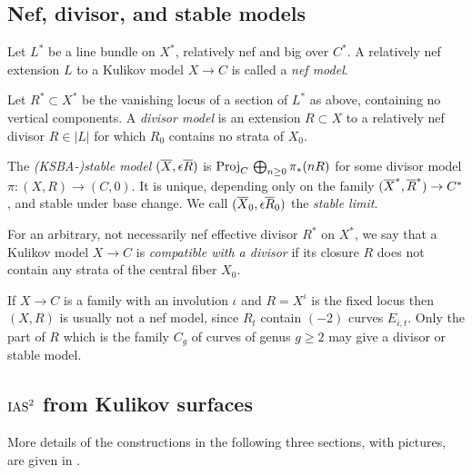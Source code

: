 \documentclass{amsart}
\begin{document}
\subsection{Nef, divisor, and stable models}
\label{sec:nef-divisor-models}

\begin{definition}
  Let $L^*$ be a line bundle on $X^*$, relatively nef and big over $C^*$.
  A relatively nef extension $L$ to a Kulikov model $X\to C$
  is called a {\it nef model}.
\end{definition}

\begin{definition}
  Let $R^*\subset X^*$ be the vanishing locus of a
  section of $L^*$ as above, containing no vertical
  components. A {\it divisor model} is an extension $R\subset X$ to a relatively
  nef divisor $R\in |L|$ for which $R_0$ contains no strata of $X_0$.
\end{definition}

\begin{definition}\label{pass-to-stable} The {\it (KSBA-)stable model} $({\overline X},\epsilon {\overline R})$
is ${\rm Proj}_C\,\bigoplus_{n\geq 0}\pi_*(nR)$ for some divisor model $\pi\colon (X,R)\to (C,0)$.
It is unique, depending only on the family $({\overline X}^*,{\overline R}^*)\to C^*$, and stable under base change.
We call $({\overline X}_0,\epsilon {\overline R}_0)$ the {\it stable limit}.
 \end{definition}

\begin{definition}
  For an arbitrary, not necessarily nef effective divisor $R^*$ on
  $X^*$, we say that a Kulikov model $X\to C$ is \emph{compatible with
    a divisor} if its closure $R$ does not contain any strata of the
  central fiber $X_0$. 
\end{definition}

If $X\to C$ is a family with an involution $\iota$ and $R=X^\iota$ is
the fixed locus then $(X,R)$ is usually not a nef model, since $R_t$
contain $(-2)$ curves $E_{i,t}$. Only the part of $R$ which is the
family $C_g$ of curves of genus $g\ge2$ may give a divisor or stable model. 

\subsection{$\operatorname{IAS}^2$ from Kulikov surfaces}
\label{sec:ias}

More details of the constructions in the following three sections,
with pictures, are given in \cite{engel2018looijenga,
  engel2021smoothings, alexeev2019stable-pair}.
\end{document}
